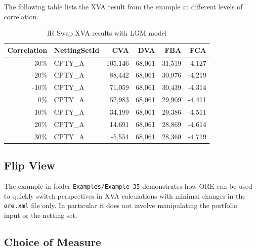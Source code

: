 The following table lists the XVA result from the example at different levels of correlation.

\begin{table}[hbt]
\scriptsize
\begin{center}
\begin{tabular}{|r|l|r|r|r|r|}
\hline
Correlation & NettingSetId & CVA & DVA & FBA & FCA \\
\hline
 -30\%  &  CPTY\_A  & 105,146  &  68,061  &  31,519  &  -4,127 \\
 -20\%  &  CPTY\_A  &  88,442  &  68,061  &  30,976  &  -4,219 \\
 -10\%  &  CPTY\_A  &  71,059  &  68,061  &  30,439  &  -4,314 \\
   0\%  &  CPTY\_A  &  52,983  &  68,061  &  29,909  &  -4,411 \\
  10\%  &  CPTY\_A  &  34,199  &  68,061  &  29,386  &  -4,511 \\
  20\%  &  CPTY\_A  &  14,691  &  68,061  &  28,869  &  -4,614 \\
  30\%  &  CPTY\_A  &  -5,554  &  68,061  &  28,360  &  -4,719 \\
\hline
\end{tabular}
\caption{IR Swap XVA results with LGM model}
\end{center}
\end{table}

\subsection{Flip View}%
\label{example:35}

The example in folder {\tt Examples/Example\_35} demonstrates how ORE can be used to quickly switch perspectives in XVA calculations with minimal changes in the {\tt ore.xml} file only. In particular it does not involve manipulating the portfolio input or the netting set.

\subsection{Choice of Measure}%
\label{example:36}

